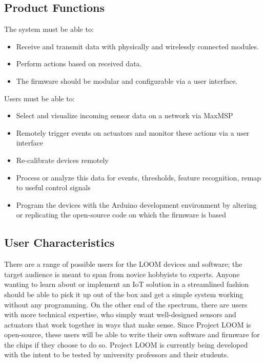 \documentclass[onecolumn, draftclsnofoot,10pt, compsoc]{IEEEtran}
\begin{document}
	\subsection{Product Functions}
		The system must be able to:
		\begin{itemize}
			\item Receive and transmit data with physically and wirelessly connected modules.
			\item Perform actions based on received data.
			\item The firmware should be modular and configurable via a user interface.
		\end{itemize}
		Users must be able to:
		\begin{itemize}
			\item Select and visualize incoming sensor data on a network via MaxMSP
			\item Remotely trigger events on actuators and monitor these actions via a user interface
			\item Re-calibrate devices remotely
			\item Process or analyze this data for events, thresholds, feature recognition, remap to useful control signals
			\item Program the devices with the Arduino development environment by altering or replicating the open-source code on which the firmware is based
		\end{itemize}

	\subsection{User Characteristics}
	There are a range of possible users for the LOOM devices and software; the target audience is meant to span from novice hobbyists to experts. Anyone wanting to learn about or implement an IoT solution in a streamlined fashion should be able to pick it up out of the box and get a simple system working without any programming. On the other end of the spectrum, there are users with more technical expertise, who simply want well-designed sensors and actuators that work together in ways that make sense. Since Project LOOM is open-source, these users will be able to write their own software and firmware for the chips if they choose to do so.
	Project LOOM is currently being developed with the intent to be tested by university professors and their students.
\end{document}
